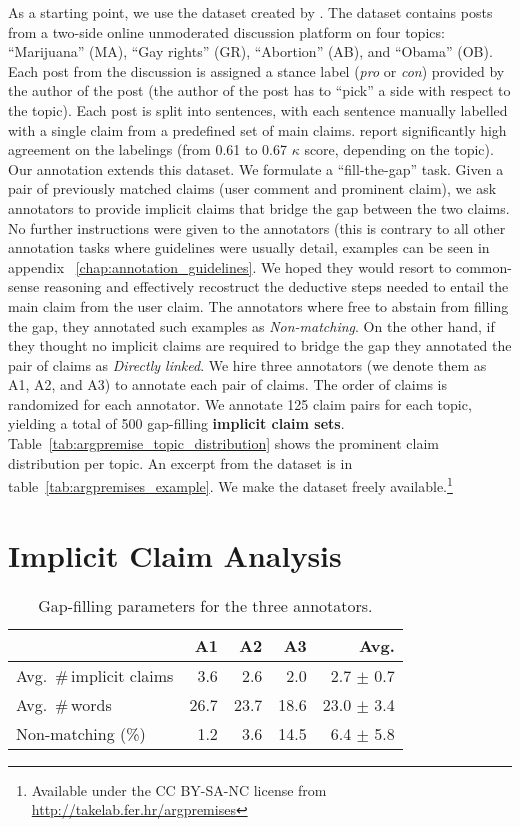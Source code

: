 As a starting point, we use the dataset created by
\citet{hasan2014you}. 
The dataset contains posts from a two-side online unmoderated discussion platform 
on four topics: ``Marijuana'' (MA), ``Gay rights'' (GR), 
``Abortion'' (AB), and ``Obama'' (OB).
Each post from the discussion is assigned a stance label (\textit{pro} or \textit{con}) 
provided by the author of the post (the author of the post has to ``pick'' a side 
with respect to the topic). 
Each post is split into sentences, with each sentence manually
labelled with a single claim from a predefined set of main 
claims. 
\citet{hasan2014you} report significantly high agreement on the labelings
(from 0.61 to 0.67 $\kappa$ score, depending on the topic). 
Our annotation extends this dataset. 
We formulate a ``fill-the-gap'' task. 
Given a pair of previously matched claims (user comment and 
prominent claim), we ask annotators to provide implicit claims that bridge the gap 
between the two claims. 
No further instructions were given to the annotators (this is contrary to all other
annotation tasks where guidelines were usually detail, examples can be seen in appendix
~\ref{chap:annotation_guidelines}. 
We hoped they would resort to common-sense reasoning and effectively 
recostruct the deductive steps needed to entail the main claim from the user
claim.
The annotators where free to abstain from filling the gap, they
annotated such examples as \emph{Non-matching}. 
On the other hand, if they thought no implicit claims are required
to bridge the gap they annotated the pair of claims as \emph{Directly linked}. 
We hire three annotators (we denote them as A1, A2, and A3) to annotate each pair of claims. 
The order of claims is randomized for each annotator. 
We annotate 125 claim pairs for each topic, yielding a total of 500 gap-filling
\textbf{implicit claim sets}. 
Table~\ref{tab:argpremise_topic_distribution} shows the prominent claim distribution per topic. 
An excerpt from the dataset is in table~\ref{tab:argpremises_example}. 
We make the dataset freely available.\footnote{Available under the CC BY-SA-NC license from
\url{http://takelab.fer.hr/argpremises}}

\section{Implicit Claim Analysis}

\begin{table}[t]
{\small
\begin{center}
\begin{tabular}{lrrrr}
\toprule
& A1 & A2 & A3 & Avg.\\
\midrule
Avg.~\#\,implicit claims  & 3.6  & 2.6   & 2.0   &  \phantom{0}2.7 $\pm$ 0.7  \\
Avg.~\#\,words     & 26.7 & 23.7  & 18.6  &  23.0 $\pm$ 3.4      \\
Non-matching (\%)     & 1.2  & 3.6   & 14.5  &  \phantom{0}6.4 $\pm$ 5.8  \\
\bottomrule
\end{tabular}
\caption{Gap-filling parameters for the three annotators.}
\label{tab:var-annotators}
\end{center}}
\end{table}

